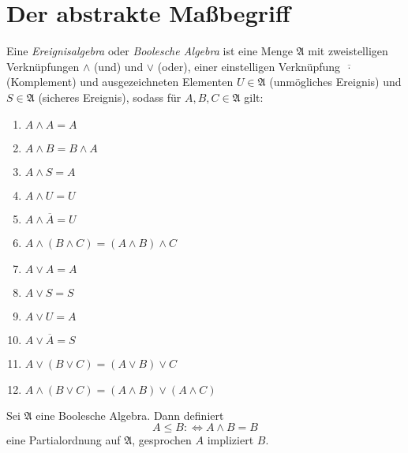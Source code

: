 \documentclass{cheat-sheet}
\begin{document}

\section{Der abstrakte Maßbegriff}


\begin{defn}
  Eine \emph{Ereignisalgebra} oder \emph{Boolesche Algebra} ist eine Menge $\mathfrak{A}$ mit zweistelligen Verknüpfungen $\wedge$ (\glqq und\grqq) und $\vee$ (\glqq oder\grqq), einer einstelligen Verknüpfung $\overline{\,\cdot\,}$ (Komplement) und ausgezeichneten Elementen $U \in \mathfrak{A}$ (unmögliches Ereignis) und $S \in \mathfrak{A}$ (sicheres Ereignis), sodass für $A, B, C \in \mathfrak{A}$ gilt:

  \begin{multicols}{2}
    \scriptsize
    \begin{enumerate}[label=\roman*.,leftmargin=2em]
      \item $A \wedge A = A$
      \item $A \wedge B = B \wedge A$
      \item $A \wedge S = A$
      \item $A \wedge U = U$
      \item $A \wedge \overline{A} = U$
      \item $A \wedge (B \wedge C) = (A \wedge B) \wedge C$
      \item $A \vee A = A$
      \item $A \vee S = S$
      \item $A \vee U = A$
      \item $A \vee \overline{A} = S$
      \item $A \vee (B \vee C) = (A \vee B) \vee C$
      \item $A \wedge (B \vee C) = (A \wedge B) \vee (A \wedge C)$
    \end{enumerate}
  \end{multicols}
\end{defn}

\begin{defn}
  Sei $\mathfrak{A}$ eine Boolesche Algebra. Dann definiert
  \[ A \leq B \colon\iff A \wedge B = B \]
  eine Partialordnung auf $\mathfrak{A}$, gesprochen $A$ impliziert $B$.
\end{defn}
\end{document}
